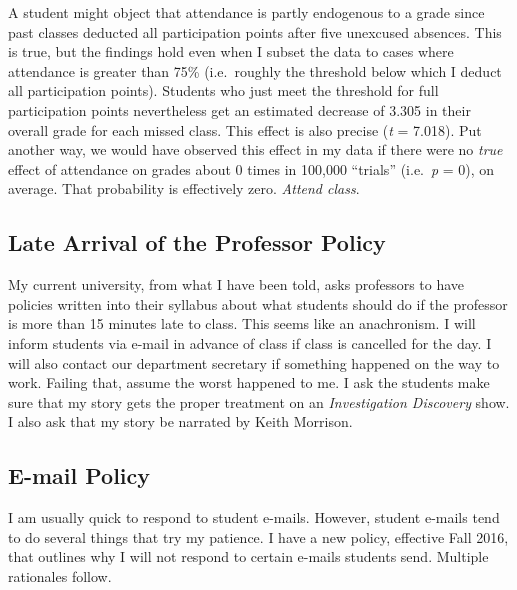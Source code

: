 \documentclass[11pt,]{article}
\begin{document}
A student might object that attendance is partly endogenous to a grade
since past classes deducted all participation points after five
unexcused absences. This is true, but the findings hold even when I
subset the data to cases where attendance is greater than 75\%
(i.e.~roughly the threshold below which I deduct all participation
points). Students who just meet the threshold for full participation
points nevertheless get an estimated decrease of 3.305 in their overall
grade for each missed class. This effect is also precise (\emph{t} =
7.018). Put another way, we would have observed this effect in my data
if there were no \emph{true} effect of attendance on grades about 0
times in 100,000 ``trials'' (i.e.~\emph{p} = 0), on average. That
probability is effectively zero. \emph{Attend class}.

\subsection{Late Arrival of the Professor
Policy}\label{late-arrival-of-the-professor-policy}

My current university, from what I have been told, asks professors to
have policies written into their syllabus about what students should do
if the professor is more than 15 minutes late to class. This seems like
an anachronism. I will inform students via e-mail in advance of class if
class is cancelled for the day. I will also contact our department
secretary if something happened on the way to work. Failing that, assume
the worst happened to me. I ask the students make sure that my story
gets the proper treatment on an \emph{Investigation Discovery} show. I
also ask that my story be narrated by Keith Morrison.

\subsection{E-mail Policy}\label{e-mail-policy}

I am usually quick to respond to student e-mails. However, student
e-mails tend to do several things that try my patience. I have a new
policy, effective Fall 2016, that outlines why I will not respond to
certain e-mails students send. Multiple rationales follow.
\end{document}
